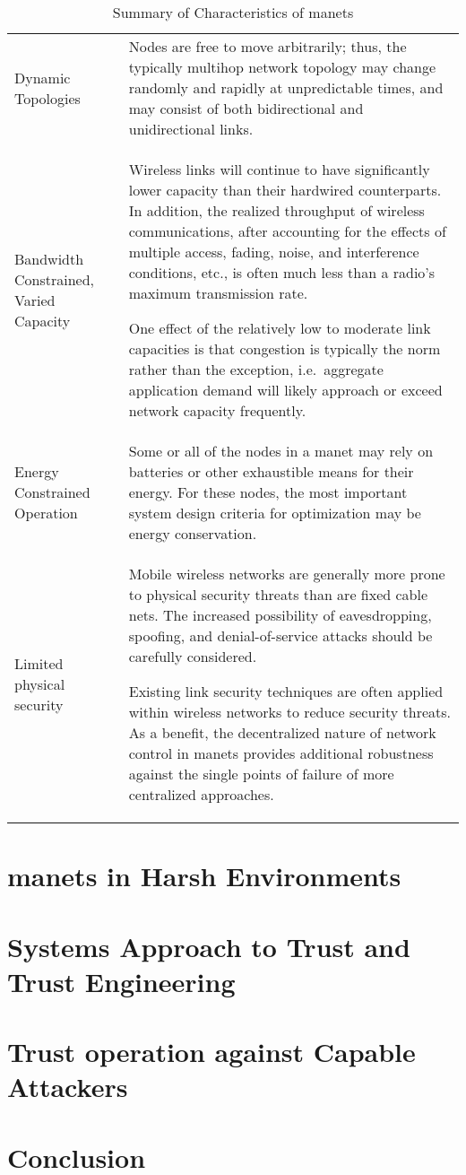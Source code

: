 \begin{table}
  \begin{tabularx}{\textwidth}{p{2cm}X}\toprule
    Dynamic Topologies & Nodes are free to move arbitrarily; thus, the typically multihop network topology may change randomly and rapidly at unpredictable times, and may consist of both bidirectional and unidirectional links.
\\
    Bandwidth Constrained, Varied Capacity & Wireless links will continue to have significantly lower capacity than their hardwired counterparts.
In addition, the realized throughput of wireless communications, after accounting for the effects of multiple access, fading, noise, and interference conditions, etc., is often much less than a radio's maximum transmission rate.
\par
One effect of the relatively low to moderate link capacities is that congestion is typically the norm rather than the exception, i.e.\  aggregate application demand will likely approach or exceed network capacity frequently.\\
    Energy Constrained Operation &  Some or all of the nodes in a \gls{manet} may rely on batteries or other exhaustible means for their energy.
For these nodes, the most important system design criteria for optimization may be energy conservation.\\
    Limited physical security & Mobile wireless networks are generally more prone to physical security threats than are fixed cable nets.
The increased possibility of eavesdropping, spoofing, and denial-of-service attacks should be carefully considered.\par
Existing link security techniques are often applied within wireless networks to reduce security threats.
As a benefit, the decentralized nature of network control in \gls{manet}s provides additional robustness against the single points of failure of more centralized approaches.\\

\end{tabularx}
\caption[Summary of Characteristics of \gls{manet}s]{Summary of Characteristics of \gls{manet}s\cite{Corson1999}}
\label{tab:manet_characteristics}
\end{table}

\section{\glspl{manet} in Harsh Environments}

\section{Systems Approach to Trust and Trust Engineering}

\section{Trust operation against Capable Attackers}



\section{Conclusion}

\ifx\ifthesis\undefined
	
\fi
